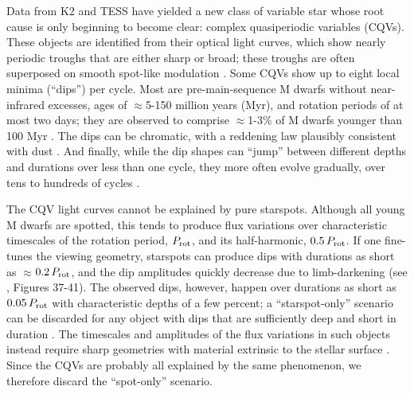 \documentclass[11pt,twocolumn,tighten]{aastex63}
\begin{document}
Data from K2 and TESS have yielded a new class of variable star whose
root cause is only beginning to become clear: complex quasiperiodic
variables (CQVs).  These objects are identified from their optical
light curves, which show nearly periodic troughs that are either sharp
or broad; these troughs are often superposed on smooth spot-like
modulation
\citep{2017AJ....153..152S,2018AJ....155...63S,2019ApJ...876..127Z}.
Some CQVs show up to eight local minima (``dips'') per cycle.  Most
are pre-main-sequence M dwarfs without near-infrared excesses, ages of
$\approx$5-150 million years (Myr), and rotation periods of at most
two days; they are observed to comprise $\approx$1-3\% of M dwarfs
younger than 100 Myr \citep{2016AJ....152..114R,2022AJ....163..144G}.
The dips can be chromatic, with a reddening law plausibly consistent
with dust
\citep{2017PASJ...69L...2O,2020AJ....160...86B,2022AJ....163..144G,2023MNRAS.518.2921K}.
And finally, while the dip shapes can ``jump'' between different
depths and durations over less than one cycle, they more often evolve
gradually, over tens to hundreds of cycles
\citep[e.g.][]{2017AJ....153..152S,2022ApJ...925...75P,2023ApJ...945..114P}.

The CQV light curves cannot be explained by pure starspots.  Although
all young M dwarfs are spotted, this tends to produce flux variations
over characteristic timescales of the rotation period, $P_{\rm rot}$,
and its half-harmonic, $0.5\,P_{\rm rot}$.  If one fine-tunes the
viewing geometry, starspots can produce dips with durations as short
as $\approx$$0.2\,P_{\rm rot}$, and the dip amplitudes quickly
decrease due to limb-darkening (see \citealt{2017AJ....153..152S},
Figures 37-41).  The observed dips, however, happen over durations as
short as $0.05\,P_{\rm rot}$ with characteristic depths of a few
percent; a ``starspot-only'' scenario can be discarded for any object
with dips that are sufficiently deep and short in duration
\citep{2017AJ....153..152S,2021MNRAS.500.1366K}.   The timescales and
amplitudes of the flux variations in such objects instead require
sharp geometries with material extrinsic to the stellar surface
\citep[e.g.][]{2017AJ....153..152S,2022AJ....163..144G}.  Since the
CQVs are probably all explained by the same phenomenon, we therefore
discard the ``spot-only'' scenario.
\end{document}
